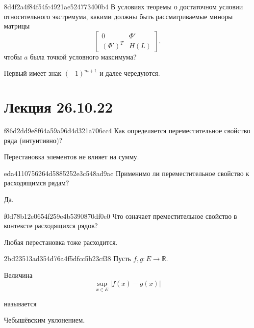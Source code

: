\begin{note}{8d4f2a4f84f54fc4921ae524773400b4}
    В условиях теоремы о достаточном условии относительного экстремума, какими должны быть рассматриваемые миноры матрицы
    \[
        \begin{bmatrix}
            0 & \Phi' \\
            (\Phi')^{T} & H(L)
        \end{bmatrix}.
    \]
    чтобы \({ a }\) была точкой условного максимума?

    \begin{cloze}{1}
        Первый имеет знак \({ (-1)^{m + 1} }\) и далее чередуются.
    \end{cloze}
\end{note}

\section{Лекция 26.10.22}
\begin{note}{f86d2dd9e8f64a59a96d4d321a706cc4}
    Как определяется переместительное свойство ряда (интуитивно)?

    \begin{cloze}{1}
        Перестановка элементов не влияет на сумму.
    \end{cloze}
\end{note}

\begin{note}{eda4110756264d5885252e3c548ad9ac}
    Применимо ли переместительное свойство к расходящимся рядам?

    \begin{cloze}{1}
        Да.
    \end{cloze}
\end{note}

\begin{note}{f0d78b12e0654f259e4b5390870df0e0}
    Что означает преместительное свойство в контексте расходящихся рядов?

    \begin{cloze}{1}
        Любая перестановка тоже расходится.
    \end{cloze}
\end{note}

\begin{note}{2bd23513ad354d76a4f5dfcc5b23cf38}
    Пусть \({ f, g : E \to \mathbb R }\).
    \begin{icloze}{1}
        Величина
        \[
            \sup_{x \in E} \left\lvert f(x) - g(x) \right\rvert
        \]
    \end{icloze}
    называется \begin{icloze}{2}Чебышёвским уклонением.\end{icloze}
\end{note}


